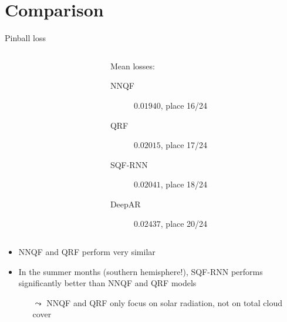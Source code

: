 \documentclass[10pt,aspectratio=169]{beamer}
\begin{document}
\section{Comparison}

\begin{frame}[fragile]{Pinball loss}
    \begin{columns}
    \begin{column}{0.5\textwidth}
        \begin{flushright}
            
        \end{flushright}
    \end{column}
    \begin{column}{0.5\textwidth}
        Mean losses:
        \begin{description}
            \item[NNQF] \(0.01940\), place 16/24
            \item[QRF] \(0.02015\), place 17/24
            \item[SQF-RNN] \(0.02041\), place 18/24
            \item[DeepAR] \(0.02437\), place 20/24
        \end{description}
    \end{column}
    \end{columns}
    
    \begin{itemize}
        \item NNQF and QRF perform very similar
        \item In the summer months (southern hemisphere!), SQF-RNN performs significantly better than NNQF and QRF models
        \begin{itemize}
            \item[\(\leadsto\)] NNQF and QRF only focus on solar radiation, not on total cloud cover
        \end{itemize}
    \end{itemize}
\end{frame}
\end{document}
